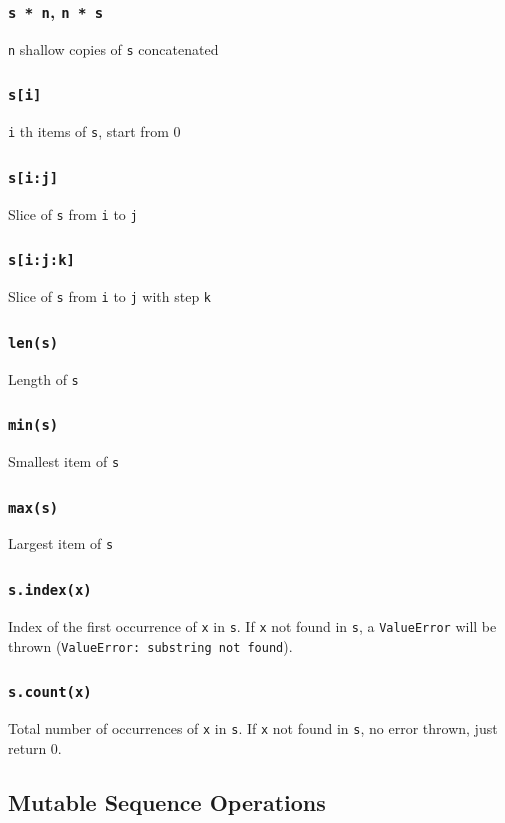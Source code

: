 \documentclass[12pt]{book}
\begin{document}
\subsubsection{\texttt{s * n}, \texttt{n * s}}
\label{sec:orga815722}
\texttt{n} shallow copies of \texttt{s} concatenated
\subsubsection{\texttt{s[i]}}
\label{sec:org8bfc500}
\texttt{i} th items of \texttt{s}, start from 0
\subsubsection{\texttt{s[i:j]}}
\label{sec:orged5aa98}
Slice of \texttt{s} from \texttt{i} to \texttt{j}
\subsubsection{\texttt{s[i:j:k]}}
\label{sec:orgef64f3c}
Slice of \texttt{s} from \texttt{i} to \texttt{j} with step \texttt{k}
\subsubsection{\texttt{len(s)}}
\label{sec:org2a0e3e2}
Length of \texttt{s}
\subsubsection{\texttt{min(s)}}
\label{sec:orgcbe1683}
Smallest item of \texttt{s}
\subsubsection{\texttt{max(s)}}
\label{sec:org513d481}
Largest item of \texttt{s}
\subsubsection{\texttt{s.index(x)}}
\label{sec:orgcc55aae}
Index of the first occurrence of \texttt{x} in \texttt{s}. If \texttt{x} not found in \texttt{s}, a \texttt{ValueError} will be thrown (\texttt{ValueError: substring not found}).
\subsubsection{\texttt{s.count(x)}}
\label{sec:org8c91085}
Total number of occurrences of \texttt{x} in \texttt{s}. If \texttt{x} not found in \texttt{s}, no error thrown, just return 0.
\subsection{Mutable Sequence Operations}
\label{sec:orgf1858ae}
\end{document}
